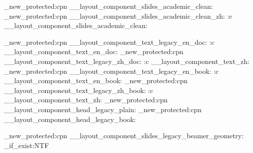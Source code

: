 \cs_new_protected:cpn { __layout_component_slides_academic_clean: }
  {
  }
\cs_new_protected:cpn { __layout_component_slides_academic_clean_zh: }
  {
    \use:c { __layout_component_slides_academic_clean: }
  }

\ExplSyntaxOff


\ExplSyntaxOn
\cs_new_protected:cpn { __layout_component_text_legacy_en_doc: }
  {
    \NextLayoutRestoreLegacyTypography
    \use:c { __layout_component_text_en_doc: }
  }
\cs_new_protected:cpn { __layout_component_text_legacy_zh_doc: }
  {
    \NextLayoutRestoreLegacyTypography
    \use:c { __layout_component_text_zh: }
    \renewcommand{\IMPEListLineStretch}{1.35}
  }
\cs_new_protected:cpn { __layout_component_text_legacy_en_book: }
  {
    \NextLayoutRestoreLegacyTypography
    \use:c { __layout_component_text_en_book: }
  }
\cs_new_protected:cpn { __layout_component_text_legacy_zh_book: }
  {
    \NextLayoutRestoreLegacyTypography
    \use:c { __layout_component_text_zh: }
    \renewcommand{\IMPEListLineStretch}{1.35}
  }
\cs_new_protected:cpn { __layout_component_head_legacy_plain: }
  { \NextLayoutRestoreLegacyPlainStyle }
\cs_new_protected:cpn { __layout_component_head_legacy_book: }
  {   }

\cs_new_protected:cpn { __layout_component_slides_legacy_beamer_geometry: }
  {
    \cs_if_exist:NTF \ifIMPEClassAspectSeen
      {
        \ifIMPEClassAspectSeen
        \else
          \geometry{paperwidth=128mm,paperheight=96mm}
        \fi
      }
      { \geometry{paperwidth=128mm,paperheight=96mm} }
  }
\ExplSyntaxOff
